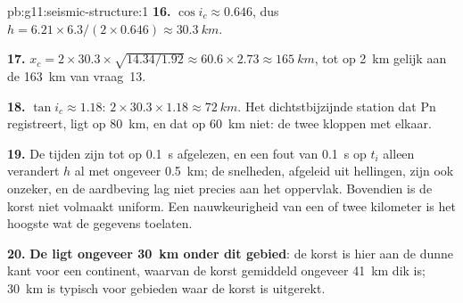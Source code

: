 \begin{solution}{pb:g11:seismic-structure:1}
\textbf{16.} $\cos i_c \approx 0.646$, dus $h = 6.21 \times 6.3/(2 \times
0.646) \approx \qty{30.3}{km}$.

\textbf{17.} $x_c = 2 \times 30.3 \times \sqrt{14.34/1.92} \approx 60.6 \times
2.73 \approx \qty{165}{km}$, tot op \qty{2}{km} gelijk aan de \qty{163}{km} van
vraag~13.

\textbf{18.} $\tan i_c \approx 1.18$: $2 \times 30.3 \times 1.18 \approx
\qty{72}{km}$. Het dichtstbijzijnde station dat Pn registreert, ligt op
\qty{80}{km}, en dat op \qty{60}{km} niet: de twee kloppen met elkaar.

\textbf{19.} De tijden zijn tot op \qty{0.1}{s} afgelezen, en een fout van
\qty{0.1}{s} op $t_i$ alleen verandert $h$ al met ongeveer \qty{0.5}{km}; de
snelheden, afgeleid uit hellingen, zijn ook onzeker, en de aardbeving lag niet
precies aan het oppervlak. Bovendien is de korst niet volmaakt uniform. Een
nauwkeurigheid van een of twee kilometer is het hoogste wat de gegevens toelaten.

\textbf{20.} \textbf{De  ligt ongeveer \qty{30}{km} onder dit gebied}: de
korst is hier aan de dunne kant voor een continent, waarvan de korst gemiddeld
ongeveer \qty{41}{km} dik is; \qty{30}{km} is typisch voor gebieden waar de korst
is uitgerekt.
\end{solution}
